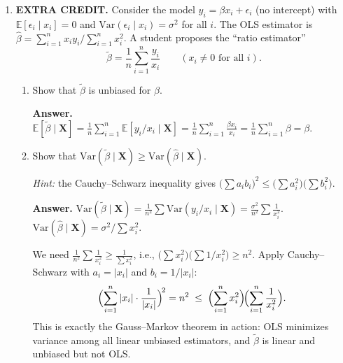 \documentclass{article}
\begin{document}
\begin{enumerate}
\textbf{Answer.} Since $\bm{C}$ is invertible, $\text{col}(\bm{Z}) = \text{col}(\bm{XC}) = \text{col}(\bm{X})$: any $\bm{Za}$ equals $\bm{X}(\bm{Ca})$, and any $\bm{Xb}$ equals $\bm{Z}(\bm{C}^{-1}\bm{b})$.  The two column spaces are the same, so the projection matrices are the same: $\bm{P}_Z = \bm{P}_X$.  Therefore $\hat{\bm{e}}_Z = (\bm{I} - \bm{P}_Z)\bm{y} = (\bm{I} - \bm{P}_X)\bm{y} = \hat{\bm{e}}_X$, and $\hat\sigma^2_Z = \hat{\bm{e}}_Z'\hat{\bm{e}}_Z/(n-k) = \hat{\bm{e}}_X'\hat{\bm{e}}_X/(n-k) = \hat\sigma^2_X$.

Note: the individual coefficients \emph{do} change ($\hat{\bm{\gamma}} = \bm{C}^{-1}\hat{\bfbeta}$), but fitted values, residuals, and all goodness-of-fit measures are invariant to invertible reparameterizations.

\item \textbf{EXTRA CREDIT.}  Consider the model $y_i = \beta x_i + \epsilon_i$ (no intercept) with $\mathbb{E}[\epsilon_i \mid x_i] = 0$ and $\text{Var}(\epsilon_i \mid x_i) = \sigma^2$ for all $i$.  The OLS estimator is $\hat\beta = \sum_{i=1}^n x_i y_i \big/ \sum_{i=1}^n x_i^2$.  A student proposes the ``ratio estimator''
$$
  \tilde\beta = \frac{1}{n}\sum_{i=1}^n \frac{y_i}{x_i}
  \qquad (x_i \neq 0 \text{ for all } i).
$$

\begin{enumerate}
  \item Show that $\tilde\beta$ is unbiased for $\beta$.

  \textbf{Answer.} $\mathbb{E}[\tilde\beta \mid \bm{X}] = \frac{1}{n}\sum_{i=1}^n \mathbb{E}[y_i/x_i \mid \bm{X}] = \frac{1}{n}\sum_{i=1}^n \frac{\beta x_i}{x_i} = \frac{1}{n}\sum_{i=1}^n \beta = \beta$.

  \item Show that $\text{Var}(\tilde\beta \mid \bm{X}) \geq \text{Var}(\hat\beta \mid \bm{X})$.

  \emph{Hint:} the Cauchy--Schwarz inequality gives $\bigl(\sum a_i b_i\bigr)^2 \leq \bigl(\sum a_i^2\bigr)\bigl(\sum b_i^2\bigr)$.

  \textbf{Answer.}
  $\text{Var}(\tilde\beta \mid \bm{X}) = \frac{1}{n^2}\sum \text{Var}(y_i/x_i \mid \bm{X}) = \frac{\sigma^2}{n^2}\sum \frac{1}{x_i^2}$.
  $\text{Var}(\hat\beta \mid \bm{X}) = \sigma^2 \big/ \sum x_i^2$.

  We need $\frac{1}{n^2}\sum \frac{1}{x_i^2} \geq \frac{1}{\sum x_i^2}$, i.e., $\bigl(\sum x_i^2\bigr)\bigl(\sum 1/x_i^2\bigr) \geq n^2$.  Apply Cauchy--Schwarz with $a_i = |x_i|$ and $b_i = 1/|x_i|$:
  $$\Bigl(\sum_{i=1}^n |x_i|\cdot\frac{1}{|x_i|}\Bigr)^{\!2} = n^2 \;\leq\; \Bigl(\sum_{i=1}^n x_i^2\Bigr)\!\Bigl(\sum_{i=1}^n \frac{1}{x_i^2}\Bigr).$$
  This is exactly the Gauss--Markov theorem in action: OLS minimizes variance among all linear unbiased estimators, and $\tilde\beta$ is linear and unbiased but not OLS.


\end{enumerate}
\end{enumerate}
\end{document}
